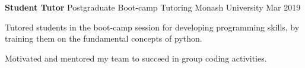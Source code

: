

\begin{cventries}

  \cventry
    {\textbf{Student Tutor}} %
    {Postgraduate Boot-camp Tutoring } %
    {Monash University} %
    {Mar 2019} %
    {
      \begin{cvitems} %
        \normalsize{\item {Tutored students in the boot-camp session for developing programming skills, by training them on the fundamental concepts of python.}
        \item{Motivated and mentored my team to succeed in group coding activities.}}
      \end{cvitems}
    }

    
    

\end{cventries}
